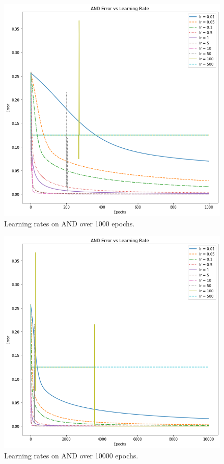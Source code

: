 \documentclass[12pt]{article}
\begin{document}
\begin{figure}
  \centering
  \includegraphics[width=\linewidth]{and_1000.png}
  \caption{Learning rates on AND over 1000 epochs.}
  \label{fig:and1000}
\end{figure}

\begin{figure}
  \centering
  \includegraphics[width=\linewidth]{and_10000.png}
  \caption{Learning rates on AND over 10000 epochs.}
  \label{fig:and10000}
\end{figure}
\end{document}
